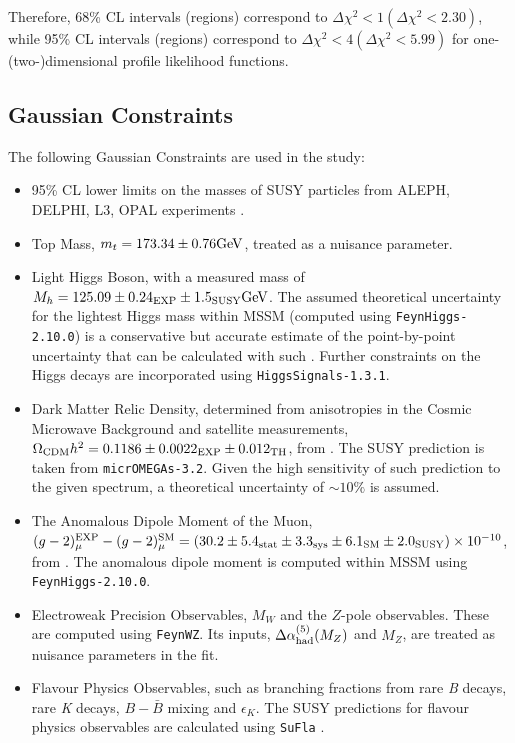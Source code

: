 Therefore, 68\% CL intervals (regions) correspond to $\Delta\chi^2 < 1 (\Delta\chi^2 < 2.30)$, while 95\% CL intervals (regions) correspond to $\Delta\chi^2 < 4 (\Delta\chi^2 < 5.99)$ for one- (two-)dimensional profile likelihood functions. 

\subsection{Gaussian Constraints}
The following Gaussian Constraints are used in the study:
\begin{itemize}
\item 95\% CL lower limits on the masses of SUSY particles from ALEPH, DELPHI, L3, OPAL experiments .
\item Top Mass, $m_t = 173.34 \pm 0.76 \rm GeV$, treated as a nuisance parameter.
\item Light Higgs Boson, with a measured mass of $M_h = 125.09 \pm 0.24_{\rm EXP} \pm 1.5_{\rm SUSY} \rm GeV$. The assumed theoretical uncertainty for the lightest Higgs mass within MSSM (computed using \texttt{FeynHiggs-2.10.0}) is a conservative but accurate estimate of the point-by-point uncertainty that can be calculated with such . Further constraints on the Higgs decays are incorporated using \texttt{HiggsSignals-1.3.1}. 
\item Dark Matter Relic Density, determined from anisotropies in the Cosmic Microwave Background and satellite measurements, $\Omega_{\rm CDM}h^2 = 0.1186 \pm 0.0022_{\rm EXP} \pm 0.012_{\rm TH}$, from . The SUSY prediction is taken from \texttt{micrOMEGAs-3.2}. Given the high sensitivity of such prediction to the given spectrum, a theoretical uncertainty of $\sim 10 \%$ is assumed.  %
\item The Anomalous Dipole Moment of the Muon, $(g-2)_{\mu}^{\rm EXP} - (g-2)_{\mu}^{\rm SM} = (30.2 \pm 5.4_{\rm stat} \pm 3.3_{\rm sys} \pm 6.1_{\rm SM} \pm 2.0_{\rm SUSY})\times 10^{-10}$, from . The anomalous dipole moment is computed within MSSM using \texttt{FeynHiggs-2.10.0}. 
\item Electroweak Precision Observables, $M_W$ and the $Z$-pole observables. These are computed using \texttt{FeynWZ}. Its inputs, $\Delta\alpha_{\rm had}^{(5)}(M_Z)$ and $M_Z$, are treated as nuisance parameters in the fit.  
\item Flavour Physics Observables, such as branching fractions from rare \textit{B} decays, rare \textit{K} decays, $B - \bar{B}$ mixing and $\epsilon_K$. The SUSY predictions for flavour physics observables are calculated using \texttt{SuFla} .
\end{itemize}

